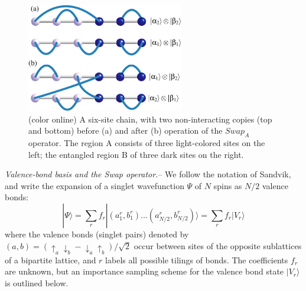 \documentclass[prl,aps,twocolumn,floatfix,amsmath,amssymb,superscriptaddress,tightenlines]{revtex4}
\begin{document}
\begin{figure} {
\includegraphics[width=2.7in]{swap_2.eps} \caption{(color online) 
\label{swap_2}
A six-site chain, with two non-interacting copies (top and bottom) before (a) and after (b) operation of the $Swap_A$ operator.  
The region A consists of three light-colored sites on the left; the entangled region B of three dark sites on the right.
}
} \end{figure}

{\it Valence-bond basis and the Swap operator.}-- We follow the notation of Sandvik, and write the expansion of a singlet
wavefunction $\Psi$ of $N$ spins as $N/2$ valence bonds:
\begin{equation}
| \Psi \rangle = \sum_r f_r|(a^r_1,b^r_1) \ldots (a^r_{N/2},b^r_{N/2}) \rangle = \sum_r f_r| V_r \rangle
\end{equation}
where the valence bonds (singlet pairs) denoted by $(a,b) = (\uparrow_a \downarrow_b - \downarrow_a \uparrow_b)/\sqrt{2}$ occur between sites of the opposite sublattices of a bipartite lattice, and $r$ labels all possible tilings of bonds.  The coefficients $f_r$ are unknown, but an importance sampling scheme for the valence bond state $| V_r \rangle$ is outlined below.  
\end{document}
